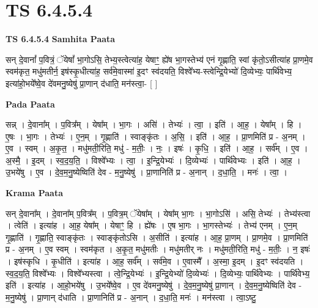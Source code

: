 \documentclass[17pt]{extarticle}
\begin{document}
\section{ TS 6.4.5.4 }

\textbf{TS 6.4.5.4 } \newline
\textbf{Samhita Paata} \newline

सन् दे॒वानां᳚ प॒वित्रं॒ ॅयेषां᳚ भा॒गोऽसि॒ तेभ्य॒स्त्वेत्या॑ह॒ येषाꣳ॒॒ ह्ये॑ष भा॒गस्तेभ्य॑ एनं गृ॒ह्णाति॒ स्वां कृ॑तो॒ऽसीत्या॑ह प्रा॒णमे॒व स्वम॑कृत॒ मधु॑मतीर्न॒ इष॑स्कृ॒धीत्या॑ह॒ सर्व॑मे॒वास्मा॑ इ॒दꣳ स्व॑दयति॒ विश्वे᳚भ्य-स्त्वेन्द्रि॒येभ्यो॑ दि॒व्येभ्यः॒ पार्थि॑वेभ्य॒ इत्या॑हो॒भये᳚ष्वे॒व दे॑वमनु॒ष्येषु॑ प्रा॒णान् द॑धाति॒ मन॑स्त्वा॒- [  ] \newline

\textbf{Pada Paata} \newline

सन्न् । दे॒वाना᳚म् । प॒वित्र᳚म् । येषा᳚म् । भा॒गः । असि॑ । तेभ्यः॑ । त्वा॒ । इति॑ । आ॒ह॒ । येषा᳚म् । हि । ए॒षः । भा॒गः । तेभ्यः॑ । ए॒न॒म् । गृ॒ह्णाति॑ । स्वाङ्कृ॑तः । अ॒सि॒ । इति॑ । आ॒ह॒ । प्रा॒णमिति॑ प्र - अ॒नम् । ए॒व । स्वम् । अ॒कृ॒त॒ । मधु॑मती॒रिति॒ मधु॑ - म॒तीः॒ । नः॒ । इषः॑ । कृ॒धि॒ । इति॑ । आ॒ह॒ । सर्व᳚म् । ए॒व । अ॒स्मै॒ । इ॒दम् । स्व॒द॒य॒ति॒ । विश्वे᳚भ्यः । त्वा॒ । इ॒न्द्रि॒येभ्यः॑ । दि॒व्येभ्यः॑ । पार्थि॑वेभ्यः । इति॑ । आ॒ह॒ । उ॒भये॑षु । ए॒व । दे॒व॒म॒नु॒ष्येष्विति॑ देव - म॒नु॒ष्येषु॑ । प्रा॒णानिति॑ प्र - अ॒नान् । द॒धा॒ति॒ । मनः॑ । त्वा॒ ।  \newline


\textbf{Krama Paata} \newline

सन् दे॒वाना᳚म् । दे॒वाना᳚म् प॒वित्र᳚म् । प॒वित्र॒म् ॅयेषा᳚म् । येषा᳚म् भा॒गः । भा॒गोऽसि॑ । असि॒ तेभ्यः॑ । तेभ्य॑स्त्वा । त्वेति॑ । इत्या॑ह । आ॒ह॒ येषा᳚म् । येषाꣳ॒॒ हि । ह्ये॑षः । ए॒ष भा॒गः । भा॒गस्तेभ्यः॑ । तेभ्य॑ एनम् । ए॒न॒म् गृ॒ह्णाति॑ । गृ॒ह्णाति॒ स्वाङ्‍कृ॑तः । स्वाङ्‍कृ॑तोऽसि । अ॒सीति॑ । इत्या॑ह । आ॒ह॒ प्रा॒णम् । प्रा॒णमे॒व । प्रा॒णमिति॑ प्र - अ॒नम् । ए॒व स्वम् । स्वम॑कृत । अ॒कृ॒त॒ मधु॑मतीः । मधु॑मतीर् नः । मधु॑मती॒रिति॒ मधु॑ - म॒तीः॒ । न॒ इषः॑ । इष॑स्कृधि । कृ॒धीति॑ । इत्या॑ह । आ॒ह॒ सर्व᳚म् । सर्व॑मे॒व । ए॒वास्मै᳚ । अ॒स्मा॒ इ॒दम् । इ॒दꣳ स्व॑दयति । स्व॒द॒य॒ति॒ विश्वे᳚भ्यः । विश्वे᳚भ्यस्त्वा । त्वे॒न्द्रि॒येभ्यः॑ । इ॒न्द्रि॒येभ्यो॑ दि॒व्येभ्यः॑ । दि॒व्येभ्यः॒ पार्थि॑वेभ्यः । पार्थि॑वेभ्य॒ इति॑ । इत्या॑ह । आ॒हो॒भये॑षु । उ॒भये᳚ष्वे॒व । ए॒व दे॑वमनु॒ष्येषु॑ । दे॒व॒म॒नु॒ष्येषु॑ प्रा॒णान् । दे॒व॒म॒नु॒ष्येष्विति॑ देव - म॒नु॒ष्येषु॑ । प्रा॒णान् द॑धाति । प्रा॒णानिति॑ प्र - अ॒नान् । द॒धा॒ति॒ मनः॑ । मन॑स्त्वा । त्वा॒ऽष्टु॒ \newline
\end{document}
